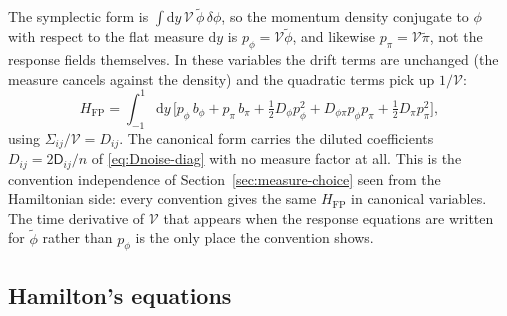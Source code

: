 \documentclass[a4paper,11pt]{article}
\newcommand{\semibold}[1]{{\fontseries{b}\selectfont{#1}}}
\renewcommand{\d}{\mathrm{d}}
\newenvironment{panel}{\begin{tcolorbox}[enhanced,breakable,colback=gray!10,colframe=gray!30]\small}{\end{tcolorbox}}
\newcommand{\field}{\phi}                    %
\newcommand{\mom}{\pi}                       %
\newcommand{\rfield}{\widetilde\field}       %
\newcommand{\rmom}{\widetilde\mom}           %
\newcommand{\yco}{y}                         %
\newcommand{\Dnoise}[1]{D_{#1}}              %
\newcommand{\Dcm}[1]{\mathsf{D}_{#1}}        %
\newcommand{\ncount}{n}                      %
\newcommand{\volel}{\mathcal{V}}             %
\newcommand{\Sigvol}[1]{\varSigma_{#1}}      %
\newcommand{\Hfp}{H_{\mathrm{FP}}}            %
\newcommand{\pfield}{p_\field}                %
\newcommand{\pmom}{p_\mom}                    %
\begin{document}
\begin{panel}
\semibold{The measure is part of the symplectic form.} The symplectic
form is $\int\d\yco\,\volel\,\rfield\,\delta\field$, so the momentum
density conjugate to $\field$ with respect to the flat measure $\d\yco$ is
$\pfield=\volel\rfield$, and likewise $\pmom=\volel\rmom$, not the response
fields themselves. In these variables the drift terms are unchanged (the
measure cancels against the density) and the quadratic terms pick up
$1/\volel$:
\begin{equation}
    \Hfp = \int_{-1}^{1}\d\yco\,\Big[\pfield\,b_\field + \pmom\,b_\mom
    + \tfrac12\Dnoise{\field}\pfield^2 + \Dnoise{\field\mom}\pfield\pmom + \tfrac12\Dnoise{\mom}\pmom^2\Big] ,
    \label{eq:hfp-canonical}
\end{equation}
using $\Sigvol{ij}/\volel=\Dnoise{ij}$. The canonical form carries the
diluted coefficients $\Dnoise{ij}=2\Dcm{ij}/\ncount$ of
\eqref{eq:Dnoise-diag} with no measure factor at all. This is the
convention independence of Section~\ref{sec:measure-choice} seen from the
Hamiltonian side: every convention gives the same $\Hfp$ in canonical
variables. The time derivative of $\volel$ that appears when the response
equations are written for $\rfield$ rather than $\pfield$ is the only
place the convention shows.
\end{panel}

\subsection{Hamilton's equations}
\end{document}
